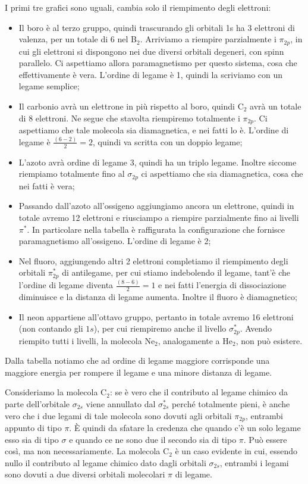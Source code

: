 I primi tre grafici sono uguali, cambia solo il riempimento degli elettroni:
\begin{itemize}
    \item Il boro è al terzo gruppo, quindi trascurando gli orbitali 1s ha 3 elettroni di valenza, per un totale di 6 nel B$_2$.
    Arriviamo a riempire parzialmente i $\pi_{2p}$, in cui gli elettroni si dispongono nei due diversi orbitali degeneri, con spinn parallelo. Ci aspettiamo allora paramagnetismo per questo sistema, cosa che effettivamente è vera. L'ordine di legame è 1, quindi la scriviamo con un legame semplice;
    \item Il carbonio avrà un elettrone in più rispetto al boro, quindi C$_2$ avrà un totale di 8 elettroni. Ne segue che stavolta riempiremo totalmente i $\pi_{2p}$. Ci aspettiamo che tale molecola sia diamagnetica, e nei fatti lo è. L'ordine di legame è $\frac{(6-2)}{2}=2$, quindi va scritta con un doppio legame;
    \item L'azoto avrà ordine di legame 3, quindi ha un triplo legame. Inoltre siccome riempiamo totalmente fino al $\sigma_{2p}$ ci aspettiamo che sia diamagnetica, cosa che nei fatti è vera;
    \item Passando dall'azoto all'ossigeno aggiungiamo ancora un elettrone, quindi in totale avremo 12 elettroni e riusciampo a riempire parzialmente fino ai livelli $\pi^*$. In particolare nella tabella è raffigurata la configurazione che fornisce paramagnetismo all'ossigeno. L'ordine di legame è 2;
    \item Nel fluoro, aggiungendo altri 2 elettroni completiamo il riempimento degli orbitali $\pi_{2p}^*$ di antilegame, per cui stiamo indebolendo il legame, tant'è che l'ordine di legame diventa $\frac{(8-6)}{2}=1$ e nei fatti l'energia di dissociazione diminuisce e la distanza di legame aumenta. Inoltre il fluoro è diamagnetico;
    \item Il neon appartiene all'ottavo gruppo, pertanto in totale avremo 16 elettroni (non contando gli $1s$), per cui riempiremo anche il livello $\sigma_{2p}^*$. Avendo riempito tutti i livelli, la molecola Ne$_2$, analogamente a He$_2$, non può esistere.
\end{itemize}
Dalla tabella notiamo che ad ordine di legame maggiore corrisponde una maggiore energia per rompere il legame e una minore distanza di legame.

\vspace{0.2cm}Consideriamo la molecola C$_2$: se è vero che il contributo al legame chimico da parte dell'orbitale $\sigma_{2s}$ viene annullato dal $\sigma_{2s}^*$ perché totalmente pieni, è anche vero che i due legami di tale molecola sono dovuti agli orbitali $\pi_{2p}$, entrambi appunto di tipo $\pi$. È quindi da sfatare la credenza che quando c'è un solo legame esso sia di tipo $\sigma$ e quando ce ne sono due il secondo sia di tipo $\pi$. Può essere così, ma non necessariamente. La molecola C$_2$ è un caso evidente in cui, essendo nullo il contributo al legame chimico dato dagli orbitali $\sigma_{2s}$, entrambi i legami sono dovuti a due diversi orbitali molecolari $\pi$ di legame.

